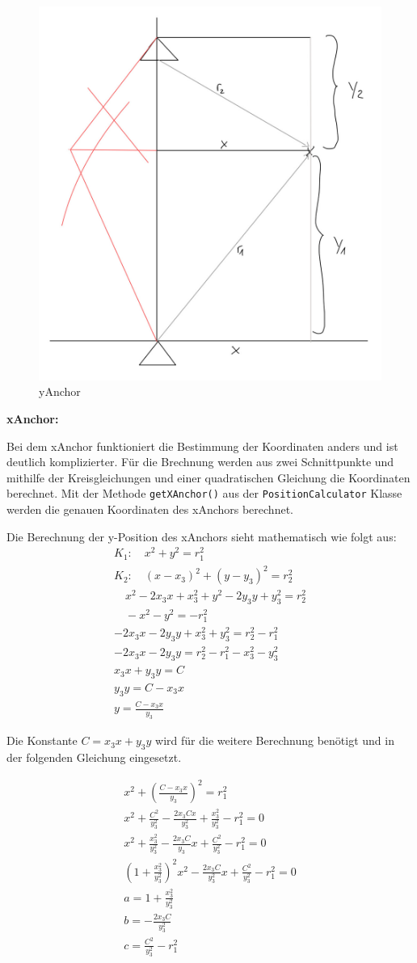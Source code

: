 \begin{figure}[H]
	\centering
	\includegraphics[width=0.4\linewidth]{images/yAnchor.jpeg}
	\caption[yAnchor]{yAnchor}
	\label{fig:yAnchor}
\end{figure}

\newpage
\textbf{xAnchor:}

Bei dem xAnchor funktioniert die Bestimmung der Koordinaten anders und ist deutlich komplizierter. Für die Brechnung werden aus zwei Schnittpunkte und mithilfe der Kreisgleichungen und einer quadratischen Gleichung die Koordinaten berechnet. Mit der Methode \texttt{getXAnchor()} aus der \texttt{PositionCalculator} Klasse werden die genauen Koordinaten des xAnchors berechnet.

Die Berechnung der y-Position des xAnchors sieht mathematisch wie folgt aus:
\label{BerechnungXAnchor}
\begin{gather*}
	K_1: \quad x^2 + y^2 = r_{1}^{2} \\
	K_2: \quad (x - x_{3})^2 + (y - y_{3})^2 = r_{2}^{2} \\
	\quad x^2 - 2x_{3}x + x_{3}^{2} + y^2 - 2y_{3}y + y_{3}^{2} = r_{2}^{2} \\
	 \quad -x^2 - y^2 = -r_{1}^{2} \\
	-2x_{3}x - 2y_{3}y + x_{3}^{2} + y_{3}^{2} = r_{2}^{2} - r_{1}^{2} \\
	-2x_{3}x - 2y_{3}y = r_{2}^{2} - r_{1}^{2} - x_{3}^{2} - y_{3}^{2} \\
	x_{3}x + y_{3}y = C \\
	y_{3}y = C - x_{3}x \\
	y = \frac{C - x_{3}x}{y_{3}}
\end{gather*}

Die Konstante \texttt{\ensuremath{C= x_3 x + y_3 y}} wird für die weitere Berechnung benötigt und in der folgenden Gleichung eingesetzt.

\begin{gather*}
	x^2 + \left( \frac{C - x_3 x}{y_3} \right)^2 = r_1^2 \\
	x^2 + \frac{C^2}{y_3^2} - \frac{2x_3 Cx}{y_3^2} + \frac{x_3^2}{y_3^2} - r_1^2 = 0 \\
	x^2 + \frac{x_3^2}{y_3^2} - \frac{2x_3 C}{y_3}x + \frac{C^2}{y_3^2} - r_1^2 = 0\\
	\left( 1 + \frac{x_3^2}{y_3^2} \right)^2x^2 - \frac{2x_3 C}{y_3^2}x + \frac{C^2}{y_3^2} - r_1^2 = 0 \\
	a = 1 + \frac{x_3^2}{y_3^2} \\
	b = -\frac{2x_3 C}{y_3^2} \\
	c = \frac{C^2}{y_3^2} - r_1^2
\end{gather*}

